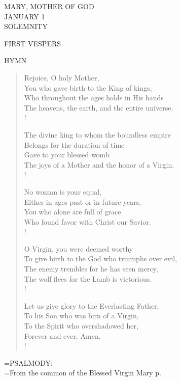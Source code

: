 \begin{center}\normalsize MARY, MOTHER OF GOD\\
\footnotesize JANUARY 1\\
\footnotesize SOLEMNITY\\
\end{center}

\begin{flushleft}\normalsize FIRST VESPERS\\\end{flushleft}

\noindent\small{\uppercase{Hymn }}\normalsize\label{bvm:motherofgod:hymn}
\begin{verse}
Rejoice, O holy Mother,\\
You who gave birth to the King of kings,\\
Who throughout the ages holds in His hands\\
The heavens, the earth, and the entire universe.\\!

The divine king to whom the boundless empire\\
Belongs for the duration of time\\
Gave to your blessed womb\\
The joys of a Mother and the honor of a Virgin.\\!

No woman is your equal,\\
Either in ages past or in future years,\\
You who alone are full of grace\\
Who found favor with Christ our Savior.\\!

O Virgin, you were deemed worthy\\
To give birth to the God who triumphs over evil,\\
The enemy trembles for he has seen mercy,\\
The wolf flees for the Lamb is victorious.\\!

Let us give glory to the Everlasting Father,\\
To his Son who was birn of a Virgin,\\
To the Spirit who overshadowed her,\\
Forever and ever. Amen.\\!
\end{verse}

\hangindent=\parindent \small{PSALMODY:}\\
\hangindent=\parindent  From the common of the Blessed Virgin Mary p. \pageref{common:bvm:firstVespers}\vspace{0.5em}

